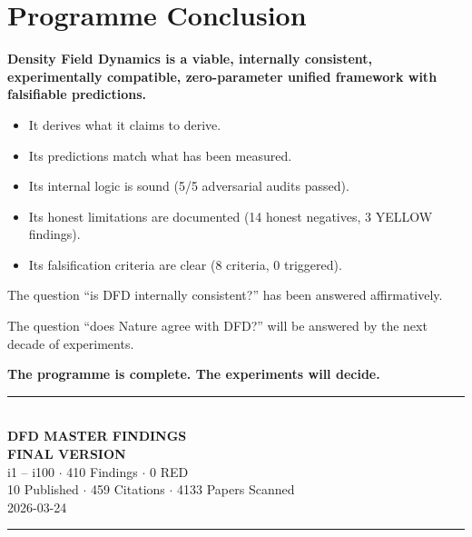 \documentclass[11pt,a4paper]{article}
\begin{document}
\section{Programme Conclusion}

\begin{tcolorbox}[colback=green!5!white, colframe=dfdgreen, title=\textbf{THE DEFINITIVE CONCLUSION}]

\textbf{Density Field Dynamics is a viable, internally consistent, experimentally compatible, zero-parameter unified framework with falsifiable predictions.}

\begin{itemize}[nosep]
\item It derives what it claims to derive.
\item Its predictions match what has been measured.
\item Its internal logic is sound (5/5 adversarial audits passed).
\item Its honest limitations are documented (14 honest negatives, 3 YELLOW findings).
\item Its falsification criteria are clear (8 criteria, 0 triggered).
\end{itemize}

The question ``is DFD internally consistent?'' has been answered affirmatively.

The question ``does Nature agree with DFD?'' will be answered by the next decade of experiments.

\vspace{12pt}
\begin{center}
\Large\textbf{The programme is complete. The experiments will decide.}
\end{center}
\end{tcolorbox}

\vspace{24pt}
\begin{center}
\rule{0.9\textwidth}{3pt}\\[18pt]
\Huge\textbf{DFD MASTER FINDINGS}\\[6pt]
\Large\textbf{FINAL VERSION}\\[12pt]
\large i1 -- i100 $\cdot$ 410 Findings $\cdot$ 0 RED\\
10 Published $\cdot$ 459 Citations $\cdot$ 4133 Papers Scanned\\[12pt]
\normalsize 2026-03-24\\[18pt]
\rule{0.9\textwidth}{3pt}
\end{center}
\end{document}
